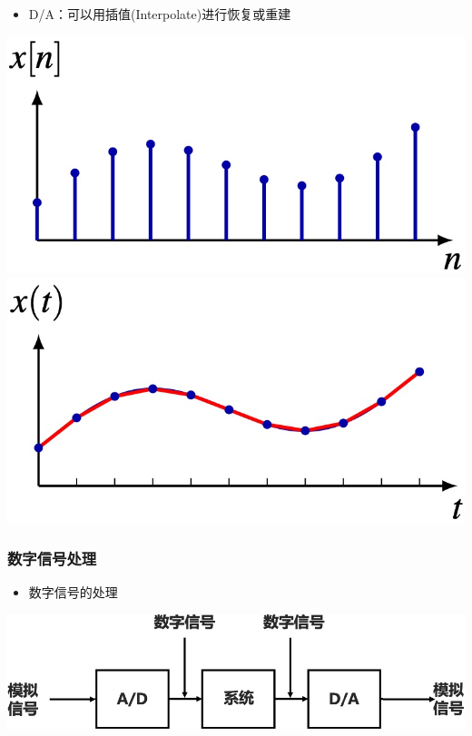 \documentclass[CJKutf8,dvipsnames,table]{beamer}
\begin{document}
\begin{CJK*}{UTF8}{song}
\begin{frame}
\begin{center}
	    \end{center}    
    \begin{itemize}
    \item D/A：可以用插值(Interpolate)进行恢复或重建
    \end{itemize}
	    \begin{center}
	    	\includegraphics[scale=0.2]{dac1}  
			\hspace{1mm}
	    	\includegraphics[scale=0.2]{dac2}  
	    \end{center}
  \end{frame}  

  \begin{frame}
    \frametitle{数字信号处理}
    \begin{itemize}
    \item 数字信号的处理
    \end{itemize}
    \begin{center}
      \includegraphics[scale=.3]{dsp}
    \end{center}
  \end{frame}
  

\end{CJK*}
\end{document}
